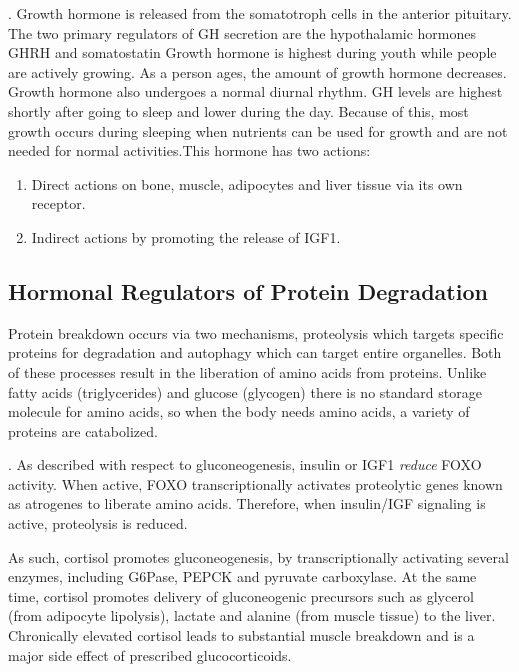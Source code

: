 \documentclass{tufte-handout}
\begin{document}
.  Growth hormone is released from the somatotroph cells in the anterior pituitary.  The two primary regulators of GH secretion are the hypothalamic hormones GHRH and somatostatin  Growth hormone is highest during youth while people are actively growing.  As a person ages, the amount of growth hormone decreases.  Growth hormone also undergoes a normal diurnal rhythm.  GH levels are highest shortly after going to sleep and lower during the day.  Because of this, most growth occurs during sleeping when nutrients can be used for growth and are not needed for normal activities.This hormone has two actions:
\begin{enumerate}
\item Direct actions on bone, muscle, adipocytes and liver tissue via its own receptor.
\item Indirect actions by promoting the release of IGF1.
\end{enumerate}

\subsection{Hormonal Regulators of Protein Degradation}
Protein breakdown occurs via two mechanisms, proteolysis which targets specific proteins for degradation and autophagy which can target entire organelles.  Both of these processes result in the liberation of amino acids from proteins.  Unlike fatty acids (triglycerides) and glucose (glycogen) there is no standard storage molecule for amino acids, so when the body needs amino acids, a variety of proteins are catabolized. 

.  As described with respect to gluconeogenesis, insulin or IGF1 \emph{reduce} FOXO activity.  When active, FOXO transcriptionally activates proteolytic genes known as atrogenes to liberate amino acids.  Therefore, when insulin/IGF signaling is active, proteolysis is reduced. 

  As such, cortisol promotes gluconeogenesis, by transcriptionally activating several enzymes, including G6Pase, PEPCK and pyruvate carboxylase.  At the same time, cortisol promotes delivery of gluconeogenic precursors such as glycerol (from adipocyte lipolysis), lactate and alanine (from muscle tissue) to the liver.  Chronically elevated cortisol leads to substantial muscle breakdown and is a major side effect of prescribed glucocorticoids.
\end{document}
